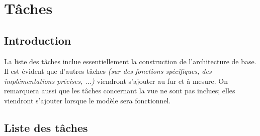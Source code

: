 \documentclass[12pt, letterpaper]{article}
\begin{document}
\section{Tâches}
\subsection{Introduction}
La liste des tâches inclue essentiellement la construction de l'architecture de base. Il est évident que d'autres tâches \textit{(sur des fonctions spécifiques, des implémentations précises, ...)} viendront s'ajouter au fur et à mesure. On remarquera aussi que les tâches concernant la vue ne sont pas inclues; elles viendront s'ajouter lorsque le modèle sera fonctionnel.
\subsection{Liste des tâches}
\end{document}
